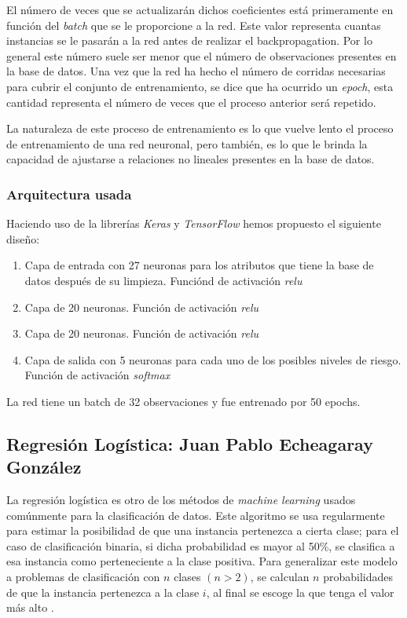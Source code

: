 \documentclass[journal]{IEEEtran}                                                          %
\begin{document}
            El número de veces que se actualizarán dichos coeficientes está primeramente en función del \emph{batch} que se le proporcione a la red. Este valor representa cuantas instancias se le pasarán a la red antes de realizar el backpropagation. Por lo general este número suele ser menor que el número de observaciones presentes en la base de datos. Una vez que la red ha hecho el número de corridas necesarias para cubrir el conjunto de entrenamiento, se dice que ha ocurrido un \emph{epoch}, esta cantidad representa el número de veces que el proceso anterior será repetido.

            La naturaleza de este proceso de entrenamiento es lo que vuelve lento el proceso de entrenamiento de una red neuronal, pero también, es lo que le brinda la capacidad de ajustarse a relaciones no lineales presentes en la base de datos.

            \subsubsection{Arquitectura usada}

            Haciendo uso de la librerías \emph{Keras} y \emph{TensorFlow} hemos propuesto el siguiente diseño:
            \begin{enumerate}
                \item Capa de entrada con 27 neuronas para los atributos que tiene la base de datos después de su limpieza. Funciónd de activación \emph{relu}
                \item Capa de 20 neuronas. Función de activación \emph{relu}
                \item Capa de 20 neuronas. Función de activación \emph{relu}
                \item Capa de salida con 5 neuronas para cada uno de los posibles niveles de riesgo. Función de activación \emph{softmax}
            \end{enumerate}

            La red tiene un batch de 32 observaciones y fue entrenado por 50 epochs.

        \subsection{Regresión Logística: Juan Pablo Echeagaray González} \label{logistic}

            La regresión logística es otro de los métodos de \emph{machine learning} usados comúnmente para la clasificación de datos. Este algoritmo se usa regularmente para estimar la posibilidad de que una instancia pertenezca a cierta clase; para el caso de clasificación binaria, si dicha probabilidad es mayor al 50\%, se clasifica a esa instancia como perteneciente a la clase positiva. Para generalizar este modelo a problemas de clasificación con $n$ clases $(n > 2)$, se calculan $n$ probabilidades de que la instancia pertenezca a la clase $i$, al final se escoge la que tenga el valor más alto \cite{geron-2019} \cite{sci-kit-learn-no-dateB}.
\end{document}
